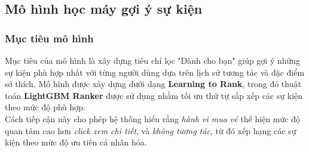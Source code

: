 \subsection{Mô hình học máy gợi ý sự kiện}
\subsubsection{Mục tiêu mô hình}
\indent \indent Mục tiêu của mô hình là xây dựng tiêu chí lọc "Dành cho bạn" giúp gợi ý những sự kiện phù hợp nhất với từng người dùng dựa trên lịch sử tương tác và đặc điểm sở thích. Mô hình được xây dựng dưới dạng \textbf{Learning to Rank}, trong đó thuật toán \textbf{LightGBM Ranker} được sử dụng nhằm tối ưu thứ tự sắp xếp các sự kiện theo mức độ phù hợp.\\
\indent Cách tiếp cận này cho phép hệ thống hiểu rằng \textit{hành vi mua vé} thể hiện mức độ quan tâm cao hơn \textit{click xem chi tiết}, và \textit{không tương tác}, từ đó xếp hạng các sự kiện theo mức độ ưu tiên cá nhân hóa.
